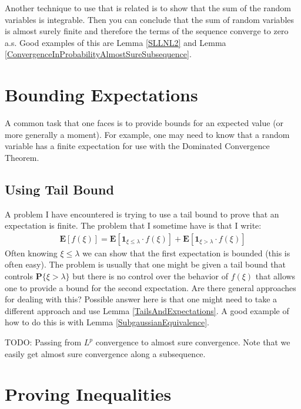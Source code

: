 \documentclass{amsbook}
\theoremstyle{definition}
\theoremstyle{remark}
\newcommand{\expectation}[1]{\textbf{E}\left[#1\right]}
\newcommand{\probability}[1]{\textbf{P}\{#1\}}
\newcommand{\characteristic}[1]{\textbf{1}_{#1}}
\begin{document}
Another technique to use that is related is to show that the sum of
the random variables is integrable.  Then you can conclude that the
sum of random variables is almost surely finite and therefore the
terms of the sequence converge to zero a.s.
Good examples of
this are Lemma \ref{SLLNL2} and Lemma
\ref{ConvergenceInProbabilityAlmostSureSubsequence}.

\section{Bounding Expectations}

A common task that one faces is to provide bounds for an expected
value (or more generally a moment).  For example, one may need to know
that a random variable has a finite expectation for use with the
Dominated Convergence Theorem.

\subsection{Using Tail Bound}
A problem I have encountered is trying to use a tail bound to prove
that an expectation is finite.  The problem that I sometime have is
that I write:
\begin{align*}
\expectation{f(\xi)} = \expectation{ \characteristic{\xi \leq \lambda}
  \cdot f(\xi)} + \expectation{\characteristic{\xi > \lambda} \cdot f(\xi)}
\end{align*}
Often knowing $\xi \leq \lambda$ we can show that the first
expectation is bounded (this is often easy).  The problem is usually
that one might be given a tail bound that controls $\probability{\xi >
  \lambda}$ but there is no control over the behavior of $f(\xi)$ that
allows one to provide a bound for the second expectation.  Are there
general approaches for dealing with this?  Possible answer here is
that one might need to take a different approach and use Lemma
\ref{TailsAndExpectations}.  A good example of how to do this is with 
Lemma \ref{SubgaussianEquivalence}.

TODO: Passing from $L^p$ convergence to almost sure convergence.  Note
that we easily get almost sure convergence along a subsequence.

\section{Proving Inequalities}
\end{document}
